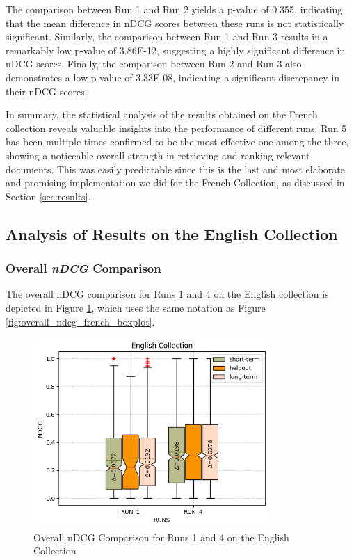The comparison between Run 1 and Run 2 yields a p-value of 0.355, indicating that the mean difference in \ac{nDCG} scores between these runs is not statistically significant. 
Similarly, the comparison between Run 1 and Run 3 results in a remarkably low p-value of 3.86E-12, suggesting a highly significant difference in \ac{nDCG} scores. 
Finally, the comparison between Run 2 and Run 3 also demonstrates a low p-value of 3.33E-08, indicating a significant discrepancy in their \ac{nDCG} scores.

In summary, the statistical analysis of the results obtained on the French collection reveals valuable insights into the performance of different runs. 
Run 5 has been multiple times confirmed to be the most effective one among the three, showing a noticeable overall strength in retrieving and ranking relevant documents.
This was easily predictable since this is the last and most elaborate and promising implementation we did for the French Collection, as discussed in Section \ref{sec:results}.   


\subsection{Analysis of Results on the English Collection}

\subsubsection{Overall \textit{nDCG} Comparison} \label{sec:ndcg_comparison_eng}

The overall \ac{nDCG} comparison for Runs 1 and 4 on the English collection is depicted in Figure \ref{fig:overall_ndcg_eng}, which uses the same notation as Figure \ref{fig:overall_ndcg_french_boxplot}.

\begin{figure}[!h]
\centering
\includegraphics[width=0.8\textwidth]{figure/StatisticalAnalysis/BoxPlot/NDGC ENGLISH.png}
\caption{Overall nDCG Comparison for Runs 1 and 4 on the English Collection}
\label{fig:overall_ndcg_eng}
\end{figure}
 

